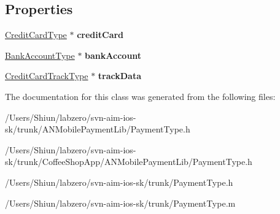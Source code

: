 \subsection*{Properties}
\begin{DoxyCompactItemize}
\item 
\hypertarget{interface_payment_type_a5a7fd4a7825dc23b99ebfb51c54d13f1}{
\hyperlink{interface_credit_card_type}{CreditCardType} $\ast$ {\bfseries creditCard}}
\label{interface_payment_type_a5a7fd4a7825dc23b99ebfb51c54d13f1}

\item 
\hypertarget{interface_payment_type_a0e5478773eeb50114d7bf30050982318}{
\hyperlink{interface_bank_account_type}{BankAccountType} $\ast$ {\bfseries bankAccount}}
\label{interface_payment_type_a0e5478773eeb50114d7bf30050982318}

\item 
\hypertarget{interface_payment_type_a6fe1e7b9f98d148df51c106de0c2a12b}{
\hyperlink{interface_credit_card_track_type}{CreditCardTrackType} $\ast$ {\bfseries trackData}}
\label{interface_payment_type_a6fe1e7b9f98d148df51c106de0c2a12b}

\end{DoxyCompactItemize}


The documentation for this class was generated from the following files:\begin{DoxyCompactItemize}
\item 
/Users/Shiun/labzero/svn-\/aim-\/ios-\/sk/trunk/ANMobilePaymentLib/PaymentType.h\item 
/Users/Shiun/labzero/svn-\/aim-\/ios-\/sk/trunk/CoffeeShopApp/ANMobilePaymentLib/PaymentType.h\item 
/Users/Shiun/labzero/svn-\/aim-\/ios-\/sk/trunk/PaymentType.h\item 
/Users/Shiun/labzero/svn-\/aim-\/ios-\/sk/trunk/PaymentType.m\end{DoxyCompactItemize}
